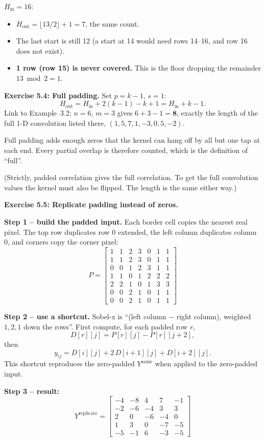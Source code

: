 $H_{\text{in}}=16$:
\begin{itemize}
  \item $H_{\text{out}}=\lfloor13/2\rfloor+1=7$, the same count.
  \item The last start is still 12 (a start at 14 would need rows 14--16, and row 16 does not exist).
  \item \textbf{1 row (row 15) is never covered.} This is the floor dropping the remainder $13 \bmod 2=1$.
\end{itemize}

\textbf{Exercise 5.4: Full padding.} Set $p=k-1$, $s=1$:
\[
H_{\text{out}}=H_{\text{in}}+2(k-1)-k+1=H_{\text{in}}+k-1.
\]
Link to Example~3.2: $n=6$, $m=3$ gives $6+3-1=\mathbf{8}$, exactly the length of the full 1-D convolution listed there, $(1,5,7,1,-3,0,5,-2)$.

Full padding adds enough zeros that the kernel can hang off by all but one tap at each end. Every partial overlap is therefore counted, which is the definition of ``full''.

(Strictly, padded correlation gives the full correlation. To get the full convolution values the kernel must also be flipped. The length is the same either way.)

\textbf{Exercise 5.5: Replicate padding instead of zeros.}

\textbf{Step 1 -- build the padded input.} Each border cell copies the nearest real pixel. The top row duplicates row 0 extended, the left column duplicates column 0, and corners copy the corner pixel:
\[
P=\begin{bmatrix}
1&1&2&3&0&1&1\\
1&1&2&3&0&1&1\\
0&0&1&2&3&1&1\\
1&1&0&1&2&2&2\\
2&2&1&0&1&3&3\\
0&0&2&1&0&1&1\\
0&0&2&1&0&1&1
\end{bmatrix}
\]

\textbf{Step 2 -- use a shortcut.} Sobel-x is ``(left column $-$ right column), weighted $1,2,1$ down the rows''. First compute, for each padded row $r$,
\[
D[r][j]=P[r][j]-P[r][j+2],
\]
then
\[
y_{ij}=D[i][j]+2\,D[i+1][j]+D[i+2][j].
\]
This shortcut reproduces the zero-padded $Y^{\text{same}}$ when applied to the zero-padded input.

\textbf{Step 3 -- result:}
\[
Y^{\text{replicate}}=\begin{bmatrix}
-4&-8&4&7&-1\\
-2&-6&-4&3&3\\
2&0&-6&-4&0\\
1&3&0&-7&-5\\
-5&-1&6&-3&-5
\end{bmatrix}
\]

